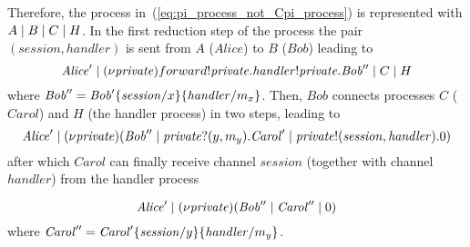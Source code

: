 Therefore, the process in~(\ref{eq:pi_process_not_Cpi_process}) is represented with $A \;|\; B \;|\; C \;|\; H$. In the first reduction step of the process the pair $(\mathit{session},\mathit{handler})$ is sent from $A$ ($\mathit{Alice}$) to $B$ ($\mathit{Bob}$) leading to 
\[
\mathit{Alice}' \;|\; (\nu \mathit{private})forward!\mathit{private}.\mathit{handler}!\mathit{private}.\mathit{Bob}'' \;|\; C \;|\; H
\]
where $\mathit{Bob}''=\mathit{Bob}'\{\mathit{session}/x\}\{\mathit{handler}/m_x\}$. Then, $\mathit{Bob}$ connects processes $C$ ($\mathit{Carol}$) and $H$ (the handler process) in two steps, leading to 
\[
\mathit{Alice}' \;|\; (\nu \mathit{private})(\mathit{Bob}'' \;|\; \mathit{private}?(y,m_y).\mathit{Carol}' \;|\;  \mathit{private}!(\mathit{session},\mathit{handler}).0)
\]
after which $\mathit{Carol}$ can finally receive channel $\mathit{session}$ (together with channel $\mathit{handler}$) from the handler process

\[
\mathit{Alice}' \;|\; (\nu \mathit{private})(\mathit{Bob}'' \;|\; \mathit{Carol}'' \;|\;  0)
\]
where $\mathit{Carol}''=\mathit{Carol}'\{\mathit{session}/y\}\{\mathit{handler}/m_y\}$. %


%
%
% 
%
%




